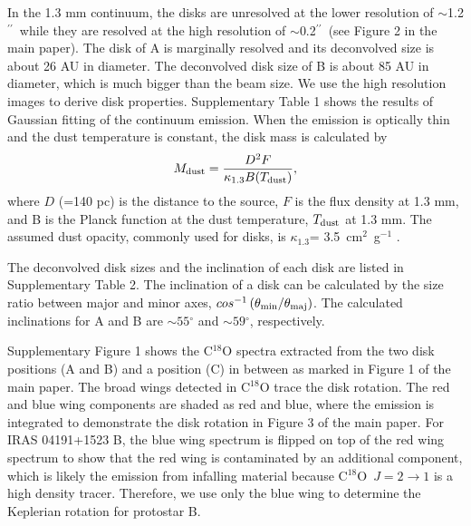 \documentclass{nature}
\newcommand{\jj}[2]{\mbox{$J = #1\rightarrow#2$}}
\newcommand{\cooo}{\mbox{C$^{18}$O}}
\newcommand{\arcsec}{\mbox{$^{\prime \prime}$}}
\newcommand{\degree}{\mbox{$^\circ$}}
\begin{document}

In the 1.3 mm continuum, the disks are unresolved at the lower resolution of $\sim$1.2\arcsec\ while they are resolved 
at the high resolution of $\sim$0.2\arcsec\ (see Figure 2 in the main paper). 
The disk of A is marginally resolved and its deconvolved size is about 26 AU
in diameter. The deconvolved disk size of B is about 85 AU in diameter, which is much bigger than the beam size.
We use the high resolution images to derive disk properties.
Supplementary Table 1 shows the results of Gaussian fitting of the continuum emission.
When the emission is optically thin and the dust temperature is constant, the disk mass is calculated by
\begin{equation}
M_{\rm dust} = \frac{D^2 F}{\kappa_{1.3} B(T_{\rm dust})},
\end{equation}
where $D$ (=140 pc) is the distance to the source, $F$ is the flux density at 1.3 mm, and B is the Planck function 
at the dust temperature, $T_{\rm dust}$ at 1.3 mm.
The assumed dust opacity, commonly used for disks\cite{Andrews2005},
is $\kappa_{1.3}$= 3.5~cm$^2$~g$^{-1}$ .

The deconvolved disk sizes and the inclination of each disk
are listed in Supplementary Table 2. 
The inclination of a disk can be calculated by the size ratio between major and minor axes, 
$cos^{-1}\left({\theta}_{\rm min}/{\theta}_{\rm maj}\right)$.
The calculated inclinations for A and B are $\sim55\degree$ and $\sim59\degree$, respectively. 



Supplementary Figure 1 shows the C$^{18}$O spectra extracted  from 
the two disk positions (A and B) and a position (C) in between as marked in Figure 1 of the main paper.
The broad wings detected in C$^{18}$O  trace the disk rotation.
The red and blue wing components are shaded as red and blue, where the emission is 
integrated to demonstrate the disk rotation in Figure 3 of the main paper. 
For IRAS 04191+1523 B, the blue wing spectrum is flipped on top of the 
red wing spectrum to show that the red wing is contaminated by an additional component,
 which is likely the emission from infalling material because \cooo\ \jj21 is a high density tracer.
Therefore, we use only the blue wing to determine the Keplerian rotation for protostar B.
\end{document}
